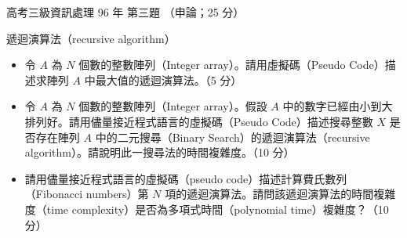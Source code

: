 \begin{pastexam}[label={px:gk3-096-ds-03}]{高考三級資訊處理 96 年 第三題}
（申論；25 分）

遞迴演算法（recursive algorithm）
\begin{itemize}[leftmargin=2.2em]
\item[㈠] 令 $A$ 為 $N$ 個數的整數陣列（Integer array）。請用虛擬碼（Pseudo Code）描述求陣列 $A$ 中最大值的遞迴演算法。（5 分）
\item[㈡] 令 $A$ 為 $N$ 個數的整數陣列（Integer array）。假設 $A$ 中的數字已經由小到大排列好。請用儘量接近程式語言的虛擬碼（Pseudo Code）描述搜尋整數 $X$ 是否存在陣列 $A$ 中的二元搜尋（Binary Search）的遞迴演算法（recursive algorithm）。請說明此一搜尋法的時間複雜度。（10 分）
\item[㈢] 請用儘量接近程式語言的虛擬碼（pseudo code）描述計算費氏數列（Fibonacci numbers）第 $N$ 項的遞迴演算法。請問該遞迴演算法的時間複雜度（time complexity）是否為多項式時間（polynomial time）複雜度？（10 分）
\end{itemize}
\end{pastexam}

